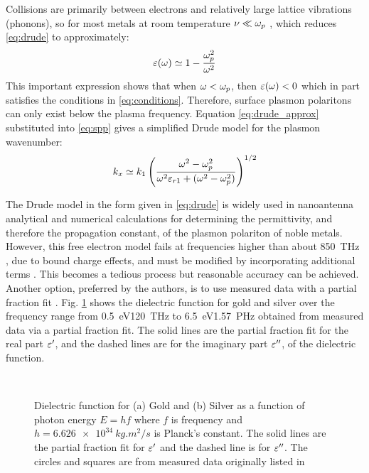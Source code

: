Collisions are primarily between electrons and relatively large lattice vibrations (phonons), so for most metals at room temperature  $\nu \ll \omega_p $ \cite{Bohren1998}, which reduces \eqref{eq:drude} to approximately:
%
\begin{equation}
  \varepsilon(\omega) \simeq 1 - \frac{\omega_p^2}{\omega^2}
  \label{eq:drude_approx}
\end{equation}
%
This important expression shows that when $\omega < \omega_p$, then $\varepsilon(\omega) < 0$  which in part satisfies the conditions in \eqref{eq:conditions}. Therefore, surface plasmon polaritons can only exist below the plasma frequency. Equation \eqref{eq:drude_approx} substituted into \eqref{eq:spp} gives a simplified Drude model for the plasmon wavenumber:
%
\begin{equation}
  k_x \simeq k_1 \left( \frac{\omega^2 - \omega_p^2}{\omega^2 \varepsilon_{r1} + (\omega^2 - \omega_p^2)} \right)^{1/2}
  \label{eq:kx_approx}
\end{equation}
%

The Drude model in the form given in \eqref{eq:drude} is widely used in nanoantenna analytical and numerical calculations for determining the permittivity, and therefore the propagation constant, of the plasmon polariton of noble metals. However, this free electron model fails at frequencies higher than about \SI{850}{\tera\Hz} \cite{Archambault2009}, due to bound charge effects, and must be modified by incorporating additional terms \cite{Bohren1998}. This becomes a tedious process but reasonable accuracy can be achieved. Another option, preferred by the authors, is to use measured data \cite{Lynch1997} with a partial fraction fit \cite{Michalski2013}. Fig. \ref{fig:permittivity} shows the dielectric function for gold and silver over the frequency range from \SI{.5}{\electronvolt}\texttildelow \SI{120}{\THz} to \SI{6.5}{\electronvolt}\texttildelow \SI{1.57}{\peta \Hz} obtained from measured data via a partial fraction fit. The solid lines are the
partial fraction fit for the real part $\varepsilon'$, and the dashed lines are for the imaginary part $\varepsilon''$, of the dielectric function.
%
\begin{figure}[t!]
  \centering
   \\
  \caption{Dielectric function for (a) Gold and (b) Silver as a function of  photon energy $E = hf$ where $f$ is frequency and $h = \SI{6.626e34} {kg.m^{2}/s}$ is Planck's constant. The solid lines are the partial fraction fit for $\varepsilon'$ and the dashed line is for $\varepsilon''$. The circles and squares are from measured data originally listed in \cite{Johnson1972}}
  \label{fig:permittivity}
\end{figure}
%

